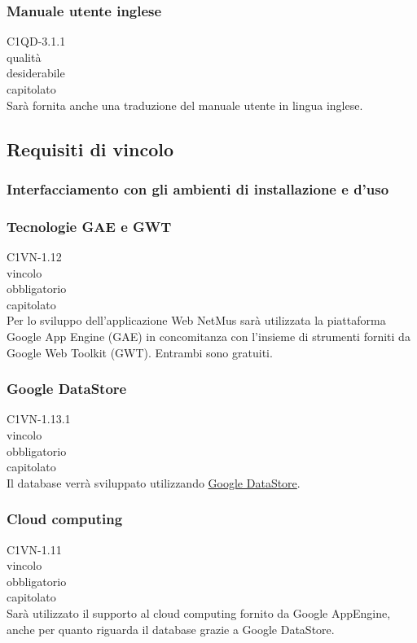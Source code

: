 \subsubsection*{Manuale utente inglese}
 C1QD-3.1.1 \\
 qualit\`a \\
 desiderabile \\
 capitolato \\
Sar\`a fornita anche una traduzione del manuale utente in lingua inglese.


\subsection{Requisiti di vincolo}

\subsubsection{Interfacciamento con gli ambienti di installazione e d'uso }

\subsubsection*{Tecnologie GAE e GWT}
 C1VN-1.12 \\
 vincolo \\
 obbligatorio \\
 capitolato \\
Per lo sviluppo dell'applicazione Web NetMus sar\`a utilizzata la piattaforma
Google App Engine (GAE) in concomitanza con l'insieme di strumenti forniti da Google Web Toolkit (GWT). Entrambi sono gratuiti.

\subsubsection*{Google DataStore}
 C1VN-1.13.1 \\
 vincolo \\
 obbligatorio \\
 capitolato \\
Il database verr\`a sviluppato utilizzando \underline{Google DataStore}.

\subsubsection*{Cloud computing}
 C1VN-1.11 \\
 vincolo \\
 obbligatorio \\
 capitolato \\
Sar\`a utilizzato il supporto al cloud computing fornito da Google AppEngine,
anche per quanto riguarda il database grazie a Google DataStore.


